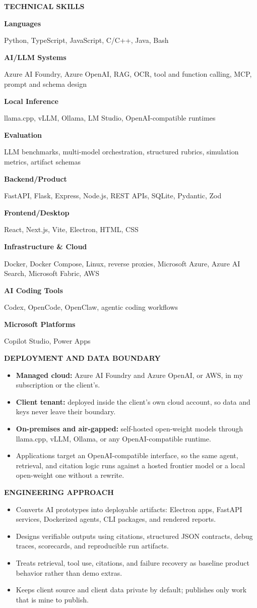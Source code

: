 \documentclass[a4paper,10pt]{article}
\newcommand{\sectionbar}[1]{%
  \vspace{7pt}
  \begin{tcolorbox}[
    enhanced,
    colback=resumeInk,
    colframe=resumeInk,
    boxrule=0pt,
    arc=0pt,
    left=7pt,
    right=7pt,
    top=4pt,
    bottom=4pt,
    width=\linewidth,
  ]
    {\color{white}\bfseries\fontsize{9.5}{11}\selectfont #1}
  \end{tcolorbox}
  \vspace{3pt}
}
\newcommand{\skillrow}[2]{%
  \textbf{#1}\par
  {\footnotesize #2}\par\vspace{5pt}
}
\begin{document}
\vspace{3pt}
\begin{minipage}[t]{0.48\linewidth}
  \vspace{0pt}
  \raggedright
  \sectionbar{TECHNICAL SKILLS}
  \skillrow{Languages}{Python, TypeScript, JavaScript, C/C++, Java, Bash}
  \skillrow{AI/LLM Systems}{Azure AI Foundry, Azure OpenAI, RAG, OCR, tool and function calling, MCP, prompt and schema design}
  \skillrow{Local Inference}{llama.cpp, vLLM, Ollama, LM Studio, OpenAI-compatible runtimes}
  \skillrow{Evaluation}{LLM benchmarks, multi-model orchestration, structured rubrics, simulation metrics, artifact schemas}
  \skillrow{Backend/Product}{FastAPI, Flask, Express, Node.js, REST APIs, SQLite, Pydantic, Zod}
  \skillrow{Frontend/Desktop}{React, Next.js, Vite, Electron, HTML, CSS}
  \skillrow{Infrastructure \& Cloud}{Docker, Docker Compose, Linux, reverse proxies, Microsoft Azure, Azure AI Search, Microsoft Fabric, AWS}
  \skillrow{AI Coding Tools}{Codex, OpenCode, OpenClaw, agentic coding workflows}
  \skillrow{Microsoft Platforms}{Copilot Studio, Power Apps}
\end{minipage}
\hfill
\begin{minipage}[t]{0.48\linewidth}
  \vspace{0pt}
  \raggedright
  \sectionbar{DEPLOYMENT AND DATA BOUNDARY}
  \begin{itemize}
    \item \textbf{Managed cloud:} Azure AI Foundry and Azure OpenAI, or AWS, in my subscription or the client's.
    \item \textbf{Client tenant:} deployed inside the client's own cloud account, so data and keys never leave their boundary.
    \item \textbf{On-premises and air-gapped:} self-hosted open-weight models through llama.cpp, vLLM, Ollama, or any OpenAI-compatible runtime.
    \item Applications target an OpenAI-compatible interface, so the same agent, retrieval, and citation logic runs against a hosted frontier model or a local open-weight one without a rewrite.
  \end{itemize}

  \sectionbar{ENGINEERING APPROACH}
  \begin{itemize}
    \item Converts AI prototypes into deployable artifacts: Electron apps, FastAPI services, Dockerized agents, CLI packages, and rendered reports.
    \item Designs verifiable outputs using citations, structured JSON contracts, debug traces, scorecards, and reproducible run artifacts.
    \item Treats retrieval, tool use, citations, and failure recovery as baseline product behavior rather than demo extras.
    \item Keeps client source and client data private by default; publishes only work that is mine to publish.
  \end{itemize}
\end{minipage}
\end{document}
